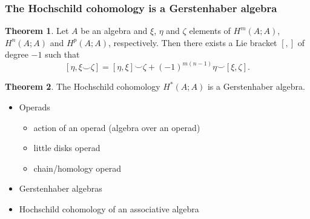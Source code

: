 \documentclass{beamer}
\theoremstyle{definition}
\newtheorem{teorema}{Theorem}
\newtheorem{defi}{Definition}
\begin{document}
\begin{frame}
	\frametitle{The Hochschild cohomology is a Gerstenhaber algebra}
	
	\begin{teorema}
		Let $A$ be an algebra and $\xi$, $\eta$ and $\zeta$ elements of $H^m(A;A)$, $H^n(A;A)$ and $H^p(A;A)$, respectively. Then there exists a Lie bracket $[,]$ of degree $-1$ such that
		\[
		[\eta, \xi\smile \zeta]=[\eta,\xi]\smile \zeta+(-1)^{m(n-1)}\eta\smile[\xi,\zeta].
		\]
	\end{teorema}\pause
	\begin{teorema}
	The Hochschild cohomology $H^*(A;A)$ is a Gerstenhaber algebra.
\end{teorema} 
\end{frame}

\begin{frame}
	\begin{itemize}
		\item Operads \checkmark
		\begin{itemize}
			\item action of an operad (algebra over an operad) \checkmark
			\item little disks operad \checkmark
			\item chain/homology operad	\checkmark		
		\end{itemize}
		\item Gerstenhaber algebras \checkmark
		\item Hochschild cohomology of an associative algebra \checkmark
	\end{itemize}
\end{frame}
%	
%
\end{document}
